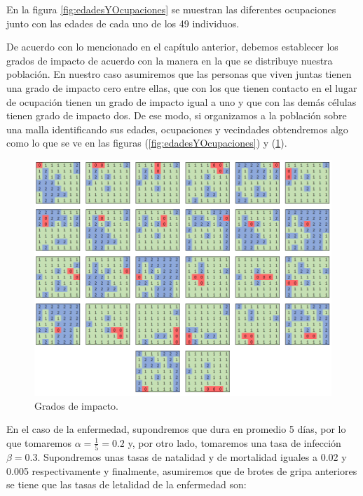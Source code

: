 En la figura \ref{fig:edadesYOcupaciones} se muestran las diferentes ocupaciones junto con las edades de cada uno de los 49 individuos.

De acuerdo con lo mencionado en el capítulo anterior, debemos establecer los grados de impacto de acuerdo con la manera en la que se distribuye nuestra población. En nuestro caso asumiremos que las personas que viven juntas tienen una grado de impacto cero entre ellas, que con los que tienen contacto en el lugar de ocupación tienen un grado de impacto igual a uno y que con las demás células tienen grado de impacto dos. De ese modo, si organizamos a la población sobre una malla identificando sus edades, ocupaciones y vecindades obtendremos algo como lo que se ve en las figuras (\ref{fig:edadesYOcupaciones}) y (\ref{fig:GradosdeImpactoEX4}).

\begin{figure}[h]
  \centering
    \includegraphics[width=1\textwidth]{Imagenes/vecindadesCap4.PNG}
    \caption{Grados de impacto.}
    \label{fig:GradosdeImpactoEX4}
\end{figure}

En el caso de la enfermedad, supondremos que dura en promedio 5 días, por lo que tomaremos $\alpha=\frac{1}{5}=0.2$ y, por otro lado, tomaremos una tasa de infección $\beta=0.3$. Supondremos unas tasas de natalidad y de mortalidad iguales a 0.02 y 0.005 respectivamente y finalmente, asumiremos que de brotes de gripa anteriores se tiene que las tasas de letalidad de la enfermedad son:

\newpage

